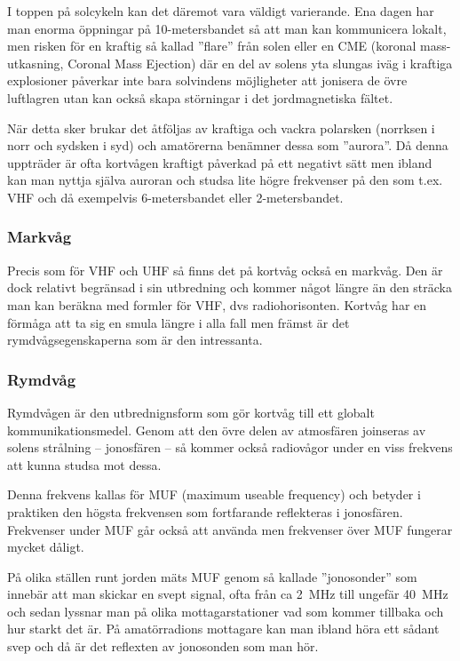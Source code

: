 I toppen på solcykeln kan det däremot vara väldigt varierande. Ena dagen har man enorma öppningar på 10-metersbandet så att man kan kommunicera lokalt, men risken för en kraftig så kallad ''flare'' från solen eller en CME (koronal mass-utkasning, Coronal Mass Ejection) där en del av solens yta slungas iväg i kraftiga explosioner påverkar inte bara solvindens möjligheter att jonisera de övre luftlagren utan kan också skapa störningar i det jordmagnetiska fältet.

När detta sker brukar det åtföljas av kraftiga och vackra polarsken (norrksen i norr och sydsken i syd) och amatörerna benämner dessa som ''aurora''. Då denna uppträder är ofta kortvågen kraftigt påverkad på ett negativt sätt men ibland kan man nyttja själva auroran och studsa lite högre frekvenser på den som t.ex. VHF och då exempelvis 6-metersbandet eller 2-metersbandet.

\subsubsection{Markvåg}

Precis som för VHF och UHF så finns det på kortvåg också en markvåg. Den är dock relativt begränsad i sin utbredning och kommer något längre än den sträcka man kan beräkna med formler för VHF, dvs radiohorisonten. Kortvåg har en förmåga att ta sig en smula längre i alla fall men främst är det rymdvågsegenskaperna som är den intressanta.

\subsubsection{Rymdvåg}

Rymdvågen är den utbrednignsform som gör kortvåg till ett globalt kommunikationsmedel. Genom att den övre delen av atmosfären joinseras av solens strålning -- jonosfären -- så kommer också radiovågor under en viss frekvens att kunna studsa mot dessa.

Denna frekvens kallas för MUF (maximum useable frequency) och betyder i praktiken den högsta frekvensen som fortfarande reflekteras i jonosfären. Frekvenser under MUF går också att använda men frekvenser över MUF fungerar mycket dåligt.

På olika ställen runt jorden mäts MUF genom så kallade ''jonosonder'' som innebär att man skickar en svept signal, ofta från ca 2~MHz till ungefär 40~MHz och sedan lyssnar man på olika mottagarstationer vad som kommer tillbaka och hur starkt det är. På amatörradions mottagare kan man ibland höra ett sådant svep och då är det reflexten av jonosonden som man hör.


